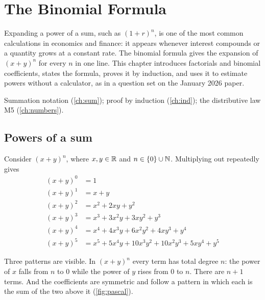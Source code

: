 \chapter{The Binomial Formula}\label{ch:binom}

\begin{chapterintro}
Expanding a power of a sum, such as $(1+r)^n$, is one of the most common calculations in economics and finance: it
appears whenever interest compounds or a quantity grows at a constant rate. The binomial formula gives the expansion of
$(x+y)^n$ for every $n$ in one line. This chapter introduces factorials and binomial coefficients, states the formula,
proves it by induction, and uses it to estimate powers without a calculator, as in a question set on the January 2026
paper.
\end{chapterintro}

\begin{prerequisites}
Summation notation (\cref{ch:sum}); proof by induction (\cref{ch:ind}); the distributive law M5 (\cref{ch:numbers}).
\end{prerequisites}

\section{Powers of a sum}\label{sec:binom-powers}

Consider $(x+y)^n$, where $x,y\in\mathbb{R}$ and $n\in\{0\}\cup\mathbb{N}$. Multiplying out repeatedly gives
\begin{align*}
(x+y)^0&=1\\
(x+y)^1&=x+y\\
(x+y)^2&=x^2+2xy+y^2\\
(x+y)^3&=x^3+3x^2y+3xy^2+y^3\\
(x+y)^4&=x^4+4x^3y+6x^2y^2+4xy^3+y^4\\
(x+y)^5&=x^5+5x^4y+10x^3y^2+10x^2y^3+5xy^4+y^5
\end{align*}

Three patterns are visible. In $(x+y)^n$ every term has total degree $n$: the power of $x$ falls from $n$ to $0$ while the
power of $y$ rises from $0$ to $n$. There are $n+1$ terms. And the coefficients are symmetric and follow a pattern in
which each is the sum of the two above it (\cref{fig:pascal}).

